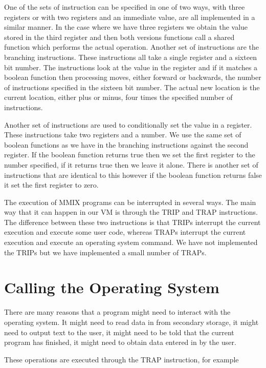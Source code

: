 \documentclass[a4paper,11pt]{report}
\begin{document}
One of the sets of instruction can be specified in one of two ways, with three registers or with two registers and an immediate value, are all implemented in a similar manner. In the case where we have three registers we obtain the value stored in the third register and then both versions functions call a shared function which performs the actual operation.
\clearpage
Another set of instructions are the branching instructions. These instructions all take a single register and a sixteen bit number. The instructions look at the value in the register and if it matches a boolean function then processing moves, either forward or backwards, the number of instructions specified in the sixteen bit number. The actual new location is the current location, either plus or minus, four times the specified number of instructions.

Another set of instructions are used to conditionally set the value in a register. These instructions take two registers and a number. We use the same set of boolean functions as we have in the branching instructions against the second register. If the boolean function returns true then we set the first register to the number specified, if it returns true then we leave it alone. There is another set of instructions that are identical to this however if the boolean function returns false it set the first register to zero.

The execution of MMIX programs can be interrupted in several ways. The main way that it can happen in our VM is through the TRIP and TRAP instructions. The difference between these two instructions is that TRIPs interrupt the current execution and execute some user code, whereas TRAPs interrupt the current execution and execute an operating system command. We have not implemented the TRIPs but we have implemented a small number of TRAPs.
\section{Calling the Operating System}\label{trip:trap}
There are many reasons that a program might need to interact with the operating system. It might need to read data in from secondary storage, it might need to output text to the user, it might need to be told that the current program has finished, it might need to obtain data entered in by the user.

These operations are executed through the TRAP instruction, for example
\end{document}
